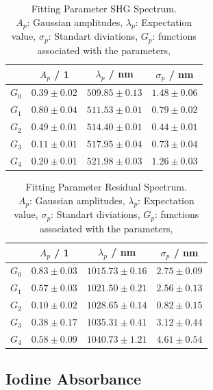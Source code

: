 \begin{table}[H]
    \label{}
    \centering
    \caption{Fitting Parameter SHG Spectrum. \\
    $A_p$: Gaussian amplitudes,
    $\lambda_p$: Expectation value,
    $\sigma_p$: Standart diviations,
    $G_p$: functions associated with the parameters,}
    
    \begin{tabular}{c|ccc} \hline
        &  $A_p$ / 1 &  $\lambda_p$ / nm & $\sigma_p$ / nm \\ \hline \hline 
    $G_0$&$0.39 \pm 0.02$&$509.85 \pm 0.13$&$1.48 \pm 0.06$\\ \hline
    $G_1$&$0.80 \pm 0.04$&$511.53 \pm 0.01$&$0.79\pm 0.02$\\ \hline
    $G_2$&$0.49 \pm 0.01$&$514.40 \pm 0.01$&$0.44 \pm 0.01$\\ \hline
    $G_3$&$0.11 \pm 0.01$&$517.95 \pm 0.04$&$0.73 \pm 0.04$\\ \hline
    $G_4$&$0.20 \pm 0.01$&$521.98 \pm 0.03$&$1.26 \pm 0.03$\\ \hline
    \end{tabular}
    \end{table}

\begin{table}[H]
        \label{}
        \centering
        \caption{Fitting Parameter Residual Spectrum. \\
        $A_p$: Gaussian amplitudes,
        $\lambda_p$: Expectation value,
        $\sigma_p$: Standart diviations,
        $G_p$: functions associated with the parameters,}
        \begin{tabular}{c|ccc} \hline
            &  $A_p$ / 1 &  $\lambda_p$ / nm & $\sigma_p$ / nm  \\ \hline  \hline 
        $G_0$&$0.83 \pm 0.03$&$1015.73 \pm 0.16$&$2.75 \pm 0.09$\\ \hline
        $G_1$&$0.57 \pm 0.03$&$1021.50 \pm 0.21$&$2.56 \pm 0.13$\\ \hline
        $G_2$&$0.10 \pm 0.02$&$1028.65 \pm 0.14$&$0.82 \pm 0.15$\\ \hline
        $G_3$&$0.38 \pm 0.17$&$1035.31 \pm 0.41$&$3.12 \pm 0.44$\\ \hline
        $G_4$&$0.58 \pm 0.09$&$1040.73 \pm 1.21$&$4.61 \pm 0.54$\\ \hline
        \end{tabular}
\end{table}   
\newpage
\subsection{Iodine Absorbance}
\label{sec:evaluation:iodine-absorbance}

